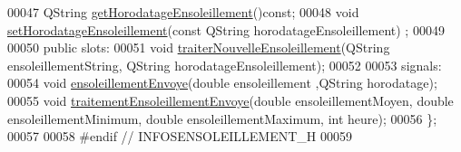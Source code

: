\begin{DoxyCode}
00047         QString \hyperlink{class_infos_ensoleillement_a0bd39540c8b4a242ea378c91bbc58b89}{getHorodatageEnsoleillement}()\textcolor{keyword}{const};
00048         \textcolor{keywordtype}{void} \hyperlink{class_infos_ensoleillement_a35cd0359b8bcf5bd572cbef2195fa8d1}{setHorodatageEnsoleillement}(\textcolor{keyword}{const} QString horodatageEnsoleillement)
      ;
00049 
00050     \textcolor{keyword}{public} slots:
00051         \textcolor{keywordtype}{void} \hyperlink{class_infos_ensoleillement_abe5426845614e3383e915dc9b3cacc3e}{traiterNouvelleEnsoleillement}(QString ensoleillementString, 
      QString horodatageEnsoleillement);
00052 
00053     signals:
00054         \textcolor{keywordtype}{void} \hyperlink{class_infos_ensoleillement_ac89935ebb118ba2d28504d7341f67a7f}{ensoleillementEnvoye}(\textcolor{keywordtype}{double} ensoleillement ,QString horodatage);
00055         \textcolor{keywordtype}{void} \hyperlink{class_infos_ensoleillement_a8c0f6c50648ffc4f47f049727e05e8d0}{traitementEnsoleillementEnvoye}(\textcolor{keywordtype}{double} ensoleillementMoyen, \textcolor{keywordtype}{
      double} ensoleillementMinimum, \textcolor{keywordtype}{double} ensoleillementMaximum, \textcolor{keywordtype}{int} heure);
00056 \};
00057 
00058 \textcolor{preprocessor}{#endif // INFOSENSOLEILLEMENT\_H}
00059 
\end{DoxyCode}
